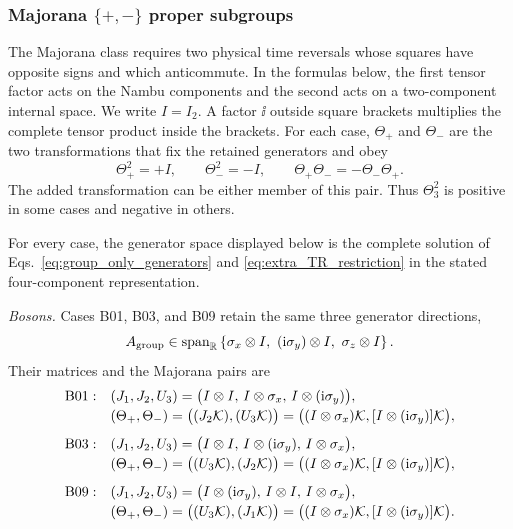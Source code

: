 \subsubsection*{\texorpdfstring{Majorana \(\{+,-\}\) proper subgroups}
{Majorana \{+,-\} proper subgroups}}

The Majorana class requires two physical time reversals whose squares have
opposite signs and which anticommute.  In the formulas below, the first tensor
factor acts on the Nambu components and the second acts on a two-component
internal space.  We write \(I=I_2\).  A factor \(\ii\) outside square brackets
multiplies the complete tensor product inside the brackets.  For each case,
\(\Theta_+\) and \(\Theta_-\) are the two transformations that fix the retained
generators and obey
\begin{equation}
    \Theta_+^2=+I,\qquad
    \Theta_-^2=-I,\qquad
    \Theta_+\Theta_-=-\Theta_-\Theta_+.
    \label{eq:proper_majorana_pair}
\end{equation}
The added transformation can be either member of this pair.  Thus
\(\Theta_3^2\) is positive in some cases and negative in others.

For every case, the generator space displayed below is the complete solution
of Eqs.~\eqref{eq:group_only_generators} and
\eqref{eq:extra_TR_restriction} in the stated four-component representation.

\medskip\noindent\textit{Bosons.}\quad
Cases B01, B03, and B09 retain the same three generator directions,
\begin{equation*}
 A_{\rm group}\in\operatorname{span}_{\mathbb R}
 \left\{
 \sigma_x\otimes I,\ 
 (\ii\sigma_y)\otimes I,\ 
 \sigma_z\otimes I
 \right\}.
\end{equation*}
Their matrices and the Majorana pairs are
\begin{align*}
\mathrm{B01}:\quad
 &(J_1,J_2,U_3)=
 \bigl(I\otimes I,\,I\otimes\sigma_x,\,
 I\otimes(\mathrm{i}\sigma_y)\bigr),\\[-2pt]
 &(\Theta_+,\Theta_-)=
 \bigl((J_2\mathcal{K}),(U_3\mathcal{K})\bigr)
 =\bigl((I\otimes\sigma_x)\mathcal{K},
 [I\otimes(\mathrm{i}\sigma_y)]\mathcal{K}\bigr),\\[4pt]
\mathrm{B03}:\quad
 &(J_1,J_2,U_3)=
 \bigl(I\otimes I,\,I\otimes(\mathrm{i}\sigma_y),\,
 I\otimes\sigma_x\bigr),\\[-2pt]
 &(\Theta_+,\Theta_-)=
 \bigl((U_3\mathcal{K}),(J_2\mathcal{K})\bigr)
 =\bigl((I\otimes\sigma_x)\mathcal{K},
 [I\otimes(\mathrm{i}\sigma_y)]\mathcal{K}\bigr),\\[4pt]
\mathrm{B09}:\quad
 &(J_1,J_2,U_3)=
 \bigl(I\otimes(\mathrm{i}\sigma_y),\,I\otimes I,\,
 I\otimes\sigma_x\bigr),\\[-2pt]
 &(\Theta_+,\Theta_-)=
 \bigl((U_3\mathcal{K}),(J_1\mathcal{K})\bigr)
 =\bigl((I\otimes\sigma_x)\mathcal{K},
 [I\otimes(\mathrm{i}\sigma_y)]\mathcal{K}\bigr).
\end{align*}

